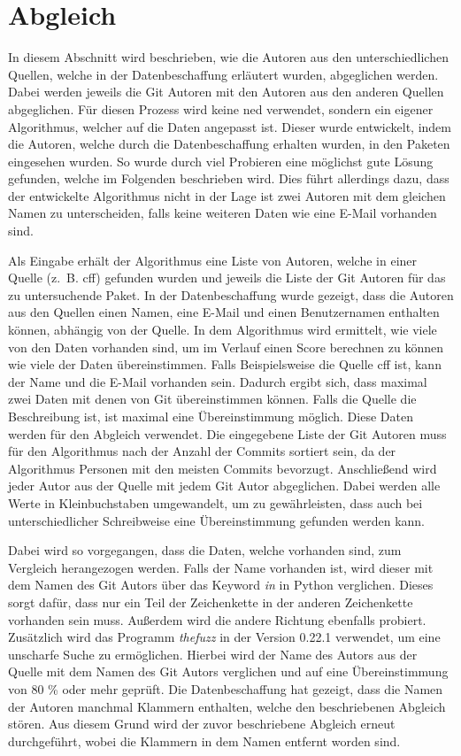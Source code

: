 \section{Abgleich}
\label{sec:abgleich}
In diesem Abschnitt wird beschrieben, wie die Autoren aus den unterschiedlichen Quellen, welche in der Datenbeschaffung erläutert wurden, abgeglichen werden.
Dabei werden jeweils die Git Autoren mit den Autoren aus den anderen Quellen abgeglichen.
Für diesen Prozess wird keine \gls{ned} verwendet, sondern ein eigener Algorithmus, welcher auf die Daten angepasst ist.
Dieser wurde entwickelt, indem die Autoren, welche durch die Datenbeschaffung erhalten wurden, in den Paketen eingesehen wurden.
So wurde durch viel Probieren eine möglichst gute Lösung gefunden, welche im Folgenden beschrieben wird.
Dies führt allerdings dazu, dass der entwickelte Algorithmus nicht in der Lage ist zwei Autoren mit dem gleichen Namen zu unterscheiden, falls keine weiteren Daten wie eine E-Mail vorhanden sind.

Als Eingabe erhält der Algorithmus eine Liste von Autoren, welche in einer Quelle (z. B. \gls{cff}) gefunden wurden und jeweils die Liste der Git Autoren für das zu untersuchende Paket.
In der Datenbeschaffung wurde gezeigt, dass die Autoren aus den Quellen einen Namen, eine E-Mail und einen Benutzernamen enthalten können, abhängig von der Quelle.
In dem Algorithmus wird ermittelt, wie viele von den Daten vorhanden sind, um im Verlauf einen Score berechnen zu können wie viele der Daten übereinstimmen.
Falls Beispielsweise die Quelle \gls{cff} ist, kann der Name und die E-Mail vorhanden sein.
Dadurch ergibt sich, dass maximal zwei Daten mit denen von Git übereinstimmen können.
Falls die Quelle die Beschreibung ist, ist maximal eine Übereinstimmung möglich.
Diese Daten werden für den Abgleich verwendet.
Die eingegebene Liste der Git Autoren muss für den Algorithmus nach der Anzahl der Commits sortiert sein, da der Algorithmus Personen mit den meisten Commits bevorzugt.
Anschließend wird jeder Autor aus der Quelle mit jedem Git Autor abgeglichen.
Dabei werden alle Werte in Kleinbuchstaben umgewandelt, um zu gewährleisten, dass auch bei unterschiedlicher Schreibweise eine Übereinstimmung gefunden werden kann.

Dabei wird so vorgegangen, dass die Daten, welche vorhanden sind, zum Vergleich herangezogen werden.
Falls der Name vorhanden ist, wird dieser mit dem Namen des Git Autors über das Keyword \emph{in} in Python verglichen.
Dieses sorgt dafür, dass nur ein Teil der Zeichenkette in der anderen Zeichenkette vorhanden sein muss.
Außerdem wird die andere Richtung ebenfalls probiert.
Zusätzlich wird das Programm \emph{thefuzz} in der Version 0.22.1 verwendet, um eine unscharfe Suche zu ermöglichen.
Hierbei wird der Name des Autors aus der Quelle mit dem Namen des Git Autors verglichen und auf eine Übereinstimmung von 80 \% oder mehr geprüft.
Die Datenbeschaffung hat gezeigt, dass die Namen der Autoren manchmal Klammern enthalten, welche den beschriebenen Abgleich stören.
Aus diesem Grund wird der zuvor beschriebene Abgleich erneut durchgeführt, wobei die Klammern in dem Namen entfernt worden sind.

